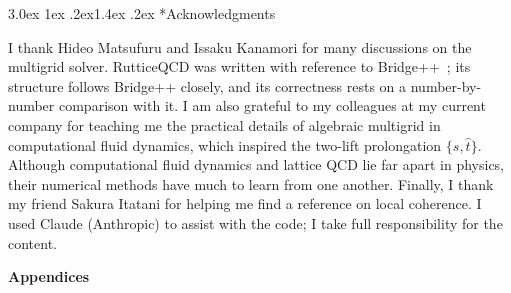 \documentclass[11pt,a4paper]{article}
\makeatletter
\newcounter{alg}
\renewcommand\thesection{\Roman{section}}
\renewcommand\thesubsection{\Alph{subsection}}
\renewcommand\section{\@startsection{section}{1}{\z@}%
  {3.0ex \@plus 1ex \@minus .2ex}{1.4ex \@plus .2ex}%
  {\centering\normalfont\normalsize\bfseries}}
\newcommand\FloatBarrier{\par\begingroup\let\@elt\relax
  \edef\@tempa{\@botlist\@deferlist\@dbldeferlist}%
  \ifx\@tempa\@empty\else\clearpage\fi\endgroup}
\let\origsection\section
\renewcommand\section{\FloatBarrier\origsection}
\numberwithin{equation}{section}
\renewcommand{\theequation}{\arabic{section}.\arabic{equation}}
\makeatother
\begin{document}
\fi
\section*{Acknowledgments}
I thank Hideo Matsufuru and Issaku Kanamori for many discussions on the multigrid solver.
RutticeQCD was written with reference to Bridge++~\cite{BridgeUeda,Bridge}; its structure
follows Bridge++ closely, and its correctness rests on a number-by-number comparison with it. I am also
grateful to my colleagues at my current company for teaching me the practical details of algebraic
multigrid in computational fluid dynamics, which inspired the two-lift prolongation $\{s,\hat t\}$.
Although computational fluid dynamics and lattice QCD lie far apart in physics, their numerical
methods have much to learn from one another. Finally, I thank my friend Sakura Itatani for helping
me find a reference on local coherence. I used Claude (Anthropic) to assist with the code; I take
full responsibility for the content.

\clearpage
\appendix
\begin{center}\Large\bfseries Appendices\end{center}
\renewcommand{\theequation}{\thesection.\arabic{equation}}
\renewcommand\thesubsection{\arabic{subsection}}
\end{document}
